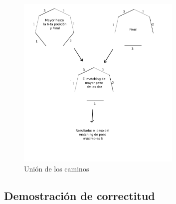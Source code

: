 \documentclass[a4paper, 12pt]{article}
\begin{document}
\begin{figure}[H]
\centering
\includegraphics[width=0.7\textwidth]{imagenes/pasosFinales.png} 
\caption{Unión de los caminos}
\end{figure}

\subsection*{Demostración de correctitud}





\end{document}
